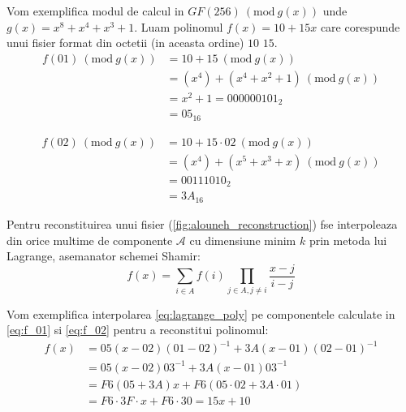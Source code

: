 \documentclass{llncs}
\newcommand{\Mod}[1]{\ (\text{mod}\ #1)}
\begin{document}
\begin{example}
Vom exemplifica modul de calcul in $GF(256) \Mod {g(x)} $ unde $g(x) = x ^ 8 + x ^ 4 + x ^ 3 + 1$. Luam polinomul $f(x) = 10 + 15x$ care corespunde unui fisier format din octetii (in aceasta ordine) $10$ $15$.
	\begin{equation} \label{eq:f_01}
	\begin{split}
		f(01) \Mod{g(x)} & = 10 + 15 \Mod{g(x)} \\
		& = (x ^ 4) + (x ^ 4 + x ^ 2 + 1) \Mod{g(x)} \\
		& = x ^ 2 + 1 = 000000101_2 \\
		& =  05_{16}
	\end{split}
	\end{equation}

	\begin{equation} \label{eq:f_02}
	\begin{split}
	 f(02) \Mod{g(x)} & = 10 + 15\cdot02 \Mod{g(x)} \\
	 & = (x ^ 4) + (x ^ 5 + x ^ 3 + x) \Mod{g(x)} \\
	 & = 00111010_2 \\
	 & = 3A_{16}
	 \end{split}
	 \end{equation}
\end{example}
Pentru reconstituirea unui fisier (\ref{fig:alouneh_reconstruction}) fse interpoleaza din orice multime de componente $\mathcal{A}$ cu dimensiune minim $k$ prin metoda lui Lagrange, asemanator schemei Shamir:
\begin{equation}
	\label{eq:lagrange_poly}
	f(x)=\sum_{i \in A} f(i) \prod_{j \in A, j \neq i} \frac{x-j}{i-j}
\end{equation}

\begin{example}
Vom exemplifica interpolarea \ref{eq:lagrange_poly} pe componentele calculate in  \ref{eq:f_01} si \ref{eq:f_02} pentru a reconstitui polinomul:
	\begin{equation}
	\begin{split}
		f(x) & = 05(x - 02)(01 - 02)^{-1} + 3A(x - 01)(02 - 01)^{-1} \\
		& = 05(x - 02)03^{-1} + 3A(x - 01)03^{-1} \\
		& = F6(05 + 3A)x + F6(05\cdot02 + 3A \cdot 01) \\
		& = F6\cdot 3F\cdot x + F6\cdot30 = 15x + 10
	\end{split}
	\end{equation}
\end{example}
\end{document}
